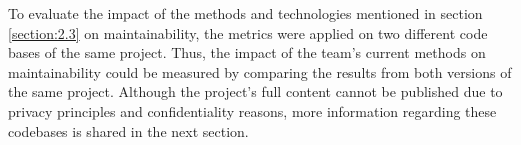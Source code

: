 To evaluate the impact of the methods and technologies mentioned in section \ref{section:2.3} on maintainability, the metrics were applied on two different code bases of the same project. Thus, the impact of the team's current methods on maintainability could be measured by comparing the results from both versions of the same project. Although the project's full content cannot be published due to privacy principles and confidentiality reasons, more information regarding these codebases is shared in the next section.